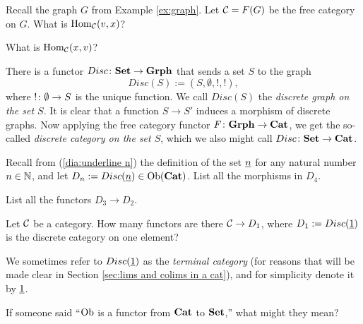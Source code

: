 \documentclass[CT4S-EN-RU]{subfiles}
\begin{document}
\begin{exercise}
Recall the graph $G$ from Example \ref{ex:graph}. Let $\mathcal{C}=F(G)$ be the free category on $G$.
\sexc What is $\textnormal{Hom}_\mathcal{C}(v,x)$?
\item What is $\textnormal{Hom}_\mathcal{C}(x,v)$?
\endsexc
\end{exercise}

\begin{example}\label{ex:discrete graph discrete cat}

There is a functor $Disc\colon{\bf Set}\rightarrow{\bf Grph}$ that sends a set $S$ to the graph $$Disc(S):=(S,\emptyset,!,!),$$ where $!\colon\emptyset\rightarrow S$ is the unique function. We call $Disc(S)$ the {\em discrete graph on the set $S$}. It is clear that a function $S\to S'$ induces a morphism of discrete graphs. Now applying the free category functor $F\colon{\bf Grph}\rightarrow{\bf Cat}$, we get the so-called {\em discrete category on the set $S$}, which we also might call $Disc\colon{\bf Set}\rightarrow{\bf Cat}$. 

\end{example}

\begin{exercise}
Recall from (\ref{dia:underline n}) the definition of the set $\underline{n}$ for any natural number $n\in{\mathbb N}$, and let $D_n:=Disc(\underline{n})\in\textnormal{Ob}({\bf Cat})$.
\sexc List all the morphisms in $D_4$. 
\item List all the functors $D_3\to D_2.$
\endsexc
\end{exercise}

\begin{exercise}\label{exc:term cat}
Let $\mathcal{C}$ be a category. How many functors are there $\mathcal{C}\rightarrow D_1$, where $D_1:=Disc(\underline{1})$ is the discrete category on one element?
\end{exercise}

We sometimes refer to $Disc(\underline{1})$ as the {\em terminal category} (for reasons that will be made clear in Section \ref{sec:lims and colims in a cat}), and for simplicity denote it by $\underline{1}$.

\begin{exercise}\label{exc:Ob is a functor}
If someone said “$\textnormal{Ob}$ is a functor from ${\bf Cat}$ to ${\bf Set}$,” what might they mean? 
\end{exercise}
\end{document}
